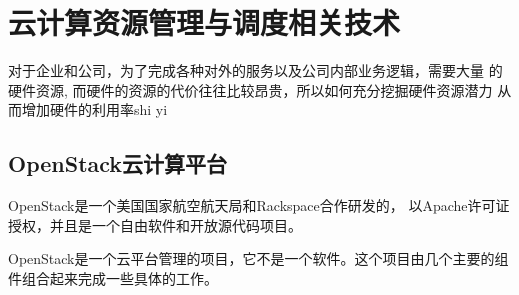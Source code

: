 
\chapter{云计算资源管理与调度相关技术}
\label{chap:outline}

对于企业和公司，为了完成各种对外的服务以及公司内部业务逻辑，需要大量
的硬件资源, 而硬件的资源的代价往往比较昂贵，所以如何充分挖掘硬件资源潜力
从而增加硬件的利用率shi yi

\section{OpenStack云计算平台}

OpenStack是一个美国国家航空航天局和Rackspace合作研发的，
以Apache许可证授权，并且是一个自由软件和开放源代码项目。

OpenStack是一个云平台管理的项目，它不是一个软件。这个项目由几个主要的组件组合起来完成一些具体的工作。

